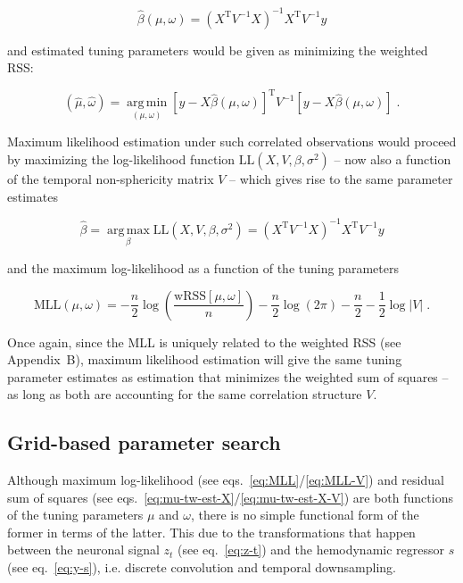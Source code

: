 \documentclass[a4paper,12pt]{article}
\begin{document}
\begin{equation} \label{eq:b-est-X-V}
\hat{\beta}(\mu,\omega) = (X^\mathrm{T} V^{-1} X)^{-1} X^\mathrm{T} V^{-1} y
\end{equation}

and estimated tuning parameters would be given as minimizing the weighted RSS:

\begin{equation} \label{eq:mu-tw-est-X-V}
(\hat{\mu},\hat{\omega}) = \operatorname*{arg\,min}_{(\mu,\omega)} \left[ y - X \hat{\beta}(\mu,\omega) \right]^\mathrm{T} V^{-1} \left[ y - X \hat{\beta}(\mu,\omega) \right] \; .
\end{equation}

Maximum likelihood estimation under such correlated observations would proceed by maximizing the log-likelihood function $\mathrm{LL}(X,V,\beta,\sigma^2)$ -- now also a function of the temporal non-sphericity matrix $V$ -- which gives rise to the same parameter estimates

\begin{equation} \label{eq:MLE-V}
\hat{\beta} = \operatorname*{arg\,max}_{\beta} \mathrm{LL}(X,V,\beta,\sigma^2) = (X^\mathrm{T} V^{-1} X)^{-1} X^\mathrm{T} V^{-1} y
\end{equation}

and the maximum log-likelihood as a function of the tuning parameters

\begin{equation} \label{eq:MLL-V}
\mathrm{MLL}(\mu,\omega) = - \frac{n}{2} \log\left( \frac{\mathrm{wRSS}\left[ \mu, \omega \right]}{n} \right) - \frac{n}{2} \log(2\pi) - \frac{n}{2} - \frac{1}{2} \log|V| \; .
\end{equation}

Once again, since the MLL is uniquely related to the weighted RSS (see Appendix~B), maximum likelihood estimation will give the same tuning parameter estimates as estimation that minimizes the weighted sum of squares -- as long as both are accounting for the same correlation structure $V$.


\pagebreak
\subsection{Grid-based parameter search}

Although maximum log-likelihood (see eqs.~\ref{eq:MLL}/\ref{eq:MLL-V}) and residual sum of squares (see eqs.~\ref{eq:mu-tw-est-X}/\ref{eq:mu-tw-est-X-V}) are both functions of the tuning parameters $\mu$ and $\omega$, there is no simple functional form of the former in terms of the latter. This due to the transformations that happen between the neuronal signal $z_t$ (see eq.~\ref{eq:z-t}) and the hemodynamic regressor $s$ (see eq.~\ref{eq:y-s}), i.e. discrete convolution and temporal downsampling.
\end{document}
